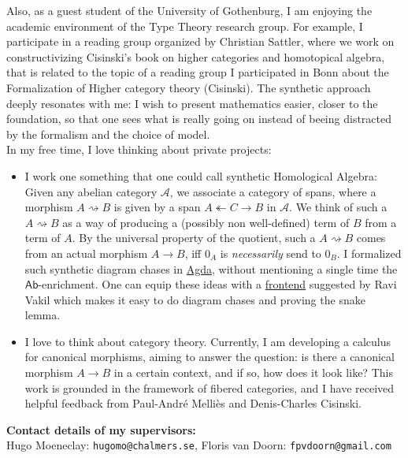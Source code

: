 \documentclass[12pt,headings=small,paper=A4,DIV=calc]{article}
\begin{document}
Also, as a guest student of the University of Gothenburg, I am enjoying the academic environment of the Type Theory research group. For example, I participate in a reading group organized by Christian Sattler, where we work on constructivizing Cisinski's book on higher categories and homotopical algebra, that is related to the topic of a reading group I participated in Bonn about the Formalization of Higher category theory (Cisinski). The synthetic approach deeply resonates with me: I wish to present mathematics easier, closer to the foundation, so that one sees what is really going on instead of beeing distracted by the formalism and the choice of model. \\
In my free time, I love thinking about private projects: 
\begin{itemize}
	\item I work one something that one could call synthetic Homological Algebra: Given any abelian category $\mathcal{A}$, we associate a category of spans, where a morphism $A \rightsquigarrow B$ is given by a span $A \twoheadleftarrow C \to B$ in $\mathcal{A}$. We think of such a $A \rightsquigarrow B$ as a way of producing a (possibly non well-defined) term of $B$ from a term of $A$. By the universal property of the quotient, such a $A \rightsquigarrow B$ comes from an actual morphism $A \to B$, iff $0_A$ is \emph{necessarily} send to $0_B$. I formalized such synthetic diagram chases in \href{https://github.com/timlichtnau/CarpetsOnAgda/blob/master/}{Agda}, without mentioning a single time the $\mathsf{Ab}$-enrichment. One can equip these ideas with a \href{https://www.3blue1brown.com/content/blog/exact-sequence-picturebook/PuzzlingThroughExactSequences.pdf}{frontend} suggested by Ravi Vakil which makes it easy to do diagram chases and proving the snake lemma. 
	\item  I love to think about category theory. Currently, I am developing a calculus for canonical morphisms, aiming to answer the question: is there a canonical morphism $A \to B$ in a certain context, and if so, how does it look like? This work is grounded in the framework of fibered categories, and I have received helpful feedback from Paul-André Melliès and Denis-Charles Cisinski. 
\end{itemize}
\textbf{Contact details of my supervisors:} \\
Hugo Moeneclay: \texttt{hugomo@chalmers.se}, Floris van Doorn: \texttt{fpvdoorn@gmail.com}
\end{document}

